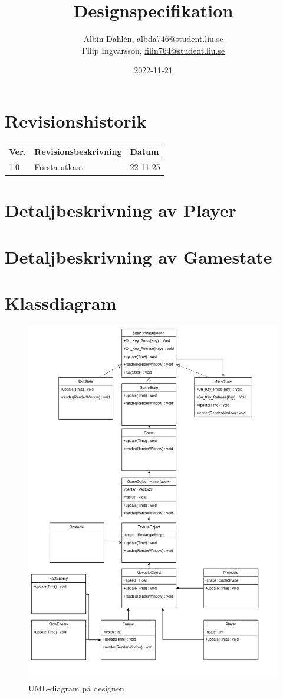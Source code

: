 \documentclass{TDP005mall}
\author{Albin Dahlén, \url{albda746@student.liu.se}\\
  Filip Ingvarsson, \url{filin764@student.liu.se}}
\title{Designspecifikation}
\date{2022-11-21}
\begin{document}
\projectpage
\section{Revisionshistorik}
\begin{table}[!h]
\begin{tabularx}{\linewidth}{|l|X|l|}
\hline
Ver. & Revisionsbeskrivning & Datum \\\hline
1.0 & Första utkast & 22-11-25 \\\hline
\end{tabularx}
\end{table}

\section{Detaljbeskrivning av Player}

\section{Detaljbeskrivning av Gamestate}

\section{Klassdiagram}

\begin{figure}[!h]
  \begin{center}
  \includegraphics[width=0.9\linewidth]{uml.png}
  \caption {UML-diagram på designen}
  \label {fig:picture}
  \end{center}
\end {figure}
\end{document}

